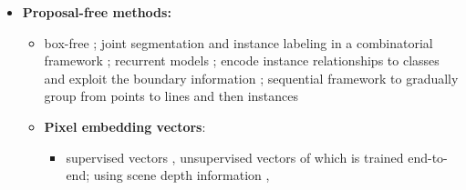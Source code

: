 \begin{itemize}
\item \textbf{Proposal-free methods:} 
\begin{itemize}
\item box-free \cite{pinheiro2015learning,pinheiro2016learning,hu2017fastmask}; joint segmentation and instance labeling in a combinatorial framework \cite{kirillov2017instancecut}; recurrent models \cite{romera2016recurrent,ren2017end}; encode instance relationships to classes and exploit the boundary information  \cite{jin2016object}; sequential framework to gradually group from points to lines and then instances \cite{liu2017sgn}
\item \textbf{Pixel embedding vectors}: 
\begin{itemize}
\item supervised vectors \cite{bai2017deep}, unsupervised vectors  \cite{kong2018recurrent,fathi2017semantic,newell2017associative,de2017semantic} of which \cite{kong2018recurrent} is trained end-to-end;  using scene depth information \cite{uhrig2016pixel},  



\end{itemize}
\end{itemize}
\end{itemize}
